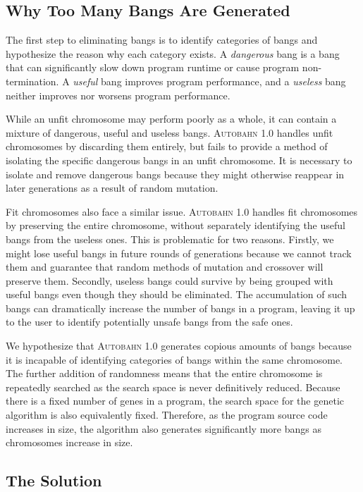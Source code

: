 \documentclass[format=sigplan, review=true]{acmart}
\newcommand{\unfit}[0]{unfit}
\newcommand{\dangerous}[0]{dangerous}
\newcommand{\useful}[0]{useful}
\newcommand{\useless}[0]{useless}
\newcommand{\Ao}[0]{\textsc{Autobahn 1.0}}
\newcommand{\fit}[0]{fit}
\begin{document}
\subsection{Why Too Many Bangs Are Generated}

The first step to eliminating bangs is to identify categories of bangs and hypothesize the reason why each category exists. A \textit{\dangerous{}} bang is a bang that can significantly slow down program runtime or cause program non-termination. A \textit{\useful{}} bang improves program performance, and a \textit{\useless{}} bang neither improves nor worsens program performance. 

While an \unfit{} chromosome may perform poorly as a whole, it can contain a mixture of \dangerous, \useful{} and \useless{} bangs. \Ao{} handles \unfit{} chromosomes by discarding them entirely, but fails to provide a method of isolating the specific \dangerous{} bangs in an \unfit{} chromosome. It is necessary to isolate and remove \dangerous{} bangs because they might otherwise reappear in later generations as a result of random mutation. 

Fit chromosomes also face a similar issue. \Ao{} handles \fit{} chromosomes by preserving the entire chromosome, without separately identifying the \useful{} bangs from the \useless{} ones. This is problematic for two reasons. Firstly, we might lose \useful{} bangs in future rounds of generations because we cannot track them and guarantee that random methods of mutation and crossover will preserve them. Secondly, \useless{} bangs could survive by being grouped with \useful{} bangs even though they should be eliminated. The accumulation of such bangs can dramatically increase the number of bangs in a program, leaving it up to the user to identify potentially unsafe bangs from the safe ones. 

We hypothesize that \Ao{} generates copious amounts of bangs because it is incapable of identifying categories of bangs within the same chromosome. The further addition of randomness means that the entire chromosome is repeatedly searched as the search space is never definitively reduced. Because there is a fixed number of genes in a program, the search space for the genetic algorithm is also equivalently fixed. Therefore, as the program source code increases in size, the algorithm also generates significantly more bangs as chromosomes increase in size. 

\subsection{The Solution}
\end{document}
